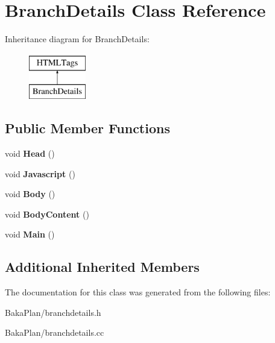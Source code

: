 \hypertarget{classBranchDetails}{\section{Branch\-Details Class Reference}
\label{classBranchDetails}
}
Inheritance diagram for Branch\-Details\-:\begin{figure}[H]
\begin{center}
\leavevmode
\includegraphics[height=2.000000cm]{classBranchDetails}
\end{center}
\end{figure}
\subsection*{Public Member Functions}
\begin{DoxyCompactItemize}
\item 
\hypertarget{classBranchDetails_a73ad3b9f45e8608a54c68f951149f7b4}{void {\bfseries Head} ()}\label{classBranchDetails_a73ad3b9f45e8608a54c68f951149f7b4}

\item 
\hypertarget{classBranchDetails_a526355c7a1abcd150805d859a6d0d576}{void {\bfseries Javascript} ()}\label{classBranchDetails_a526355c7a1abcd150805d859a6d0d576}

\item 
\hypertarget{classBranchDetails_a4a564cea32737e719441566d284ff849}{void {\bfseries Body} ()}\label{classBranchDetails_a4a564cea32737e719441566d284ff849}

\item 
\hypertarget{classBranchDetails_abfba4740c8618388b79eb6550aad980a}{void {\bfseries Body\-Content} ()}\label{classBranchDetails_abfba4740c8618388b79eb6550aad980a}

\item 
\hypertarget{classBranchDetails_aa44ca0b62d7a37d6723f6135c1672058}{void {\bfseries Main} ()}\label{classBranchDetails_aa44ca0b62d7a37d6723f6135c1672058}

\end{DoxyCompactItemize}
\subsection*{Additional Inherited Members}


The documentation for this class was generated from the following files\-:\begin{DoxyCompactItemize}
\item 
Baka\-Plan/branchdetails.\-h\item 
Baka\-Plan/branchdetails.\-cc\end{DoxyCompactItemize}
